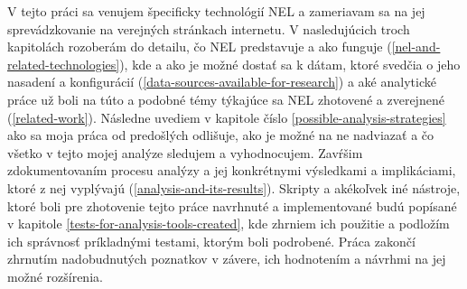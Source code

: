 \pagebreak

V tejto práci sa venujem špecificky technológií NEL a zameriavam sa na jej sprevádzkovanie na verejných stránkach 
internetu. V nasledujúcich troch kapitolách rozoberám do detailu, čo NEL predstavuje a ako funguje 
(\ref{nel-and-related-technologies}), kde a ako je možné dostať sa k dátam, ktoré svedčia o jeho nasadení a 
konfigurácií (\ref{data-sources-available-for-research}) a aké analytické práce už boli na túto a podobné témy
týkajúce sa NEL zhotovené a zverejnené (\ref{related-work}). Následne uvediem v kapitole číslo 
\ref{possible-analysis-strategies} ako sa moja práca od predošlých odlišuje, ako je možné na ne nadviazať a čo všetko
v tejto mojej analýze sledujem a vyhodnocujem. Zavŕšim zdokumentovaním procesu analýzy a jej konkrétnymi výsledkami a 
implikáciami, ktoré z nej vyplývajú (\ref{analysis-and-its-results}). 
Skripty a akékoľvek iné nástroje, ktoré boli pre zhotovenie tejto práce navrhnuté a 
implementované budú popísané v kapitole \ref{tests-for-analysis-tools-created}, kde zhrniem ich použitie a podložím 
ich správnosť príkladnými testami, ktorým boli podrobené. Práca zakončí zhrnutím nadobudnutých poznatkov v závere, ich 
hodnotením a návrhmi na jej možné rozšírenia. 
